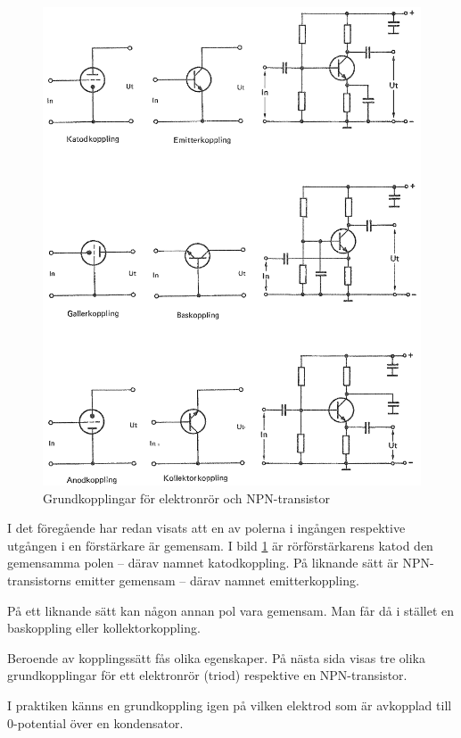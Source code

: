 \begin{figure}
\includegraphics[width=\textwidth]{images/cropped_pdfs/bild_2_3-42.pdf}
\caption{Grundkopplingar för elektronrör och NPN-transistor}
\label{fig:BildII3-42}
\end{figure}

I det föregående har redan visats att en av polerna i ingången respektive
utgången i en förstärkare är gemensam.
I bild \ref{fig:BildII3-42} är rörförstärkarens katod den gemensamma
polen -- därav namnet katodkoppling.
På liknande sätt är NPN-transistorns emitter gemensam
-- därav namnet emitterkoppling.

På ett liknande sätt kan någon annan pol vara gemensam.
Man får då i stället en baskoppling eller kollektorkoppling.

Beroende av kopplingssätt fås olika egenskaper.
På nästa sida visas tre olika grundkopplingar för ett elektronrör (triod)
respektive en NPN-transistor.

I praktiken känns en grundkoppling igen på vilken elektrod som är
avkopplad till 0-potential över en kondensator.

